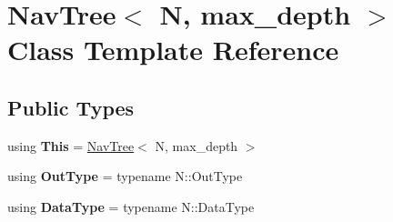 \hypertarget{classNavTree}{}\section{Nav\+Tree$<$ N, max\+\_\+depth $>$ Class Template Reference}
\label{classNavTree}
\subsection*{Public Types}
\begin{DoxyCompactItemize}
\item 
\mbox{\label{classNavTree_ad7f054678bae8142d1a9017c8a0944f4}} 
using {\bfseries This} = \hyperlink{classNavTree}{Nav\+Tree}$<$ N, max\+\_\+depth $>$
\item 
\mbox{\label{classNavTree_ae6871d35b70a2ad14366a90460c3044f}} 
using {\bfseries Out\+Type} = typename N\+::\+Out\+Type
\item 
\mbox{\label{classNavTree_afeaf6e97cf3a1587f1ca848b9d1480ed}} 
using {\bfseries Data\+Type} = typename N\+::\+Data\+Type
\end{DoxyCompactItemize}
